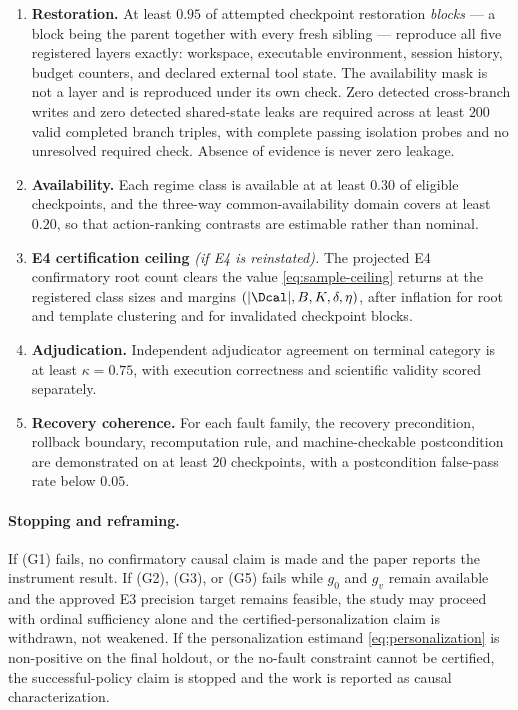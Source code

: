 \begin{enumerate}[label=(G\arabic*),leftmargin=3em]
\item \textbf{Restoration.} At least $0.95$ of attempted checkpoint restoration
  \emph{blocks} --- a block being the parent together with every fresh sibling ---
  reproduce all five registered layers exactly: workspace, executable
  environment, session history, budget counters, and declared external tool
  state.  The availability mask is not a layer and is reproduced under its own
  check.  Zero detected cross-branch writes and zero detected shared-state leaks
  are required across at least $200$ valid completed branch triples, with
  complete passing isolation probes and no unresolved required check.  Absence
  of evidence is never zero leakage.
\item \textbf{Availability.} Each regime class is available at at least $0.30$ of
  eligible checkpoints, and the three-way common-availability domain covers at
  least $0.20$, so that action-ranking contrasts are estimable rather than
  nominal.
\item \textbf{E4 certification ceiling} \emph{(if E4 is reinstated).} The projected E4 confirmatory root count clears the
  value \eqref{eq:sample-ceiling} returns at the registered class sizes and
  margins $(|\Dcal|,B,K,\delta,\eta)$, after inflation for root and template
  clustering and for invalidated checkpoint blocks.
\item \textbf{Adjudication.} Independent adjudicator agreement on terminal
  category is at least $\kappa=0.75$, with execution correctness and scientific
  validity scored separately.
\item \textbf{Recovery coherence.} For each fault family, the recovery
  precondition, rollback boundary, recomputation rule, and machine-checkable
  postcondition are demonstrated on at least $20$ checkpoints, with a
  postcondition false-pass rate below $0.05$.
\end{enumerate}

\paragraph{Stopping and reframing.}
If (G1) fails, no confirmatory causal claim is made and the paper reports the
instrument result.  If (G2), (G3), or (G5) fails while $g_0$ and $g_v$
remain available and the approved E3 precision target remains feasible, the
study may proceed with ordinal sufficiency alone and the certified-personalization
claim is withdrawn, not weakened.  If the
personalization estimand \eqref{eq:personalization} is non-positive on the final
holdout, or the no-fault constraint cannot be certified, the successful-policy
claim is stopped and the work is reported as causal characterization.

